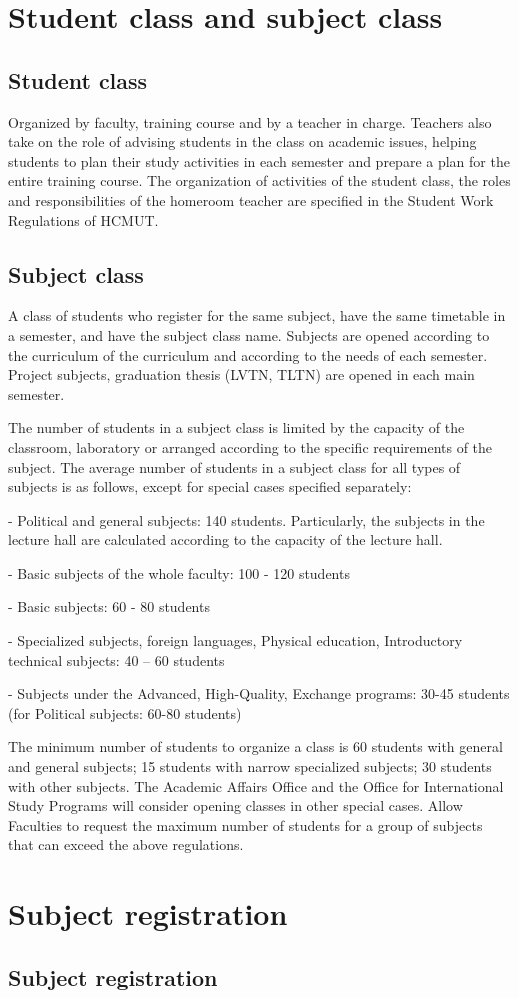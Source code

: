 \section{Student class and subject class}
\subsection{Student class}
Organized by faculty, training course and by a teacher in charge. Teachers also take on the role of advising students in the class on academic issues, helping students to plan their study activities in each semester and prepare a plan for the entire training course. The organization of activities of the student class, the roles and responsibilities of the homeroom teacher are specified in the Student Work Regulations of HCMUT.

\subsection{Subject class}
A class of students who register for the same subject, have the same timetable in a semester, and have the subject class name. Subjects are opened according to the curriculum of the curriculum and according to the needs of each semester. Project subjects, graduation thesis (LVTN, TLTN) are opened in each main semester.

The number of students in a subject class is limited by the capacity of the classroom, laboratory or arranged according to the specific requirements of the subject. The average number of students in a subject class for all types of subjects is as follows, except for special cases specified separately:

- Political and general subjects: 140 students. Particularly, the subjects in the lecture hall are calculated according to the capacity of the lecture hall.

- Basic subjects of the whole faculty: 100 - 120 students

- Basic subjects: 60 - 80 students

- Specialized subjects, foreign languages, Physical education, Introductory technical subjects: 40 – 60 students

- Subjects under the Advanced, High-Quality, Exchange programs: 30-45 students (for Political subjects: 60-80 students)

The minimum number of students to organize a class is 60 students with general and general subjects; 15 students with narrow specialized subjects; 30 students with other subjects. The Academic Affairs Office and the Office for International Study Programs will consider opening classes in other special cases. Allow Faculties to request the maximum number of students for a group of subjects that can exceed the above regulations.

\section{Subject registration}
\subsection{Subject registration}